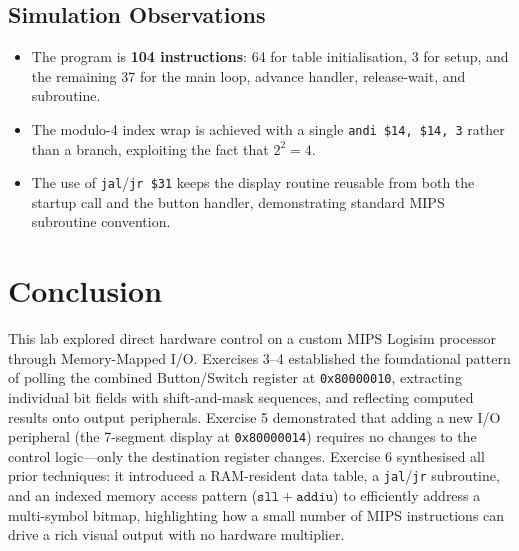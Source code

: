\documentclass[12pt,a4paper]{article}
\begin{document}
\subsection{Simulation Observations}
\begin{itemize}
    \item The program is \textbf{104 instructions}: 64 for table initialisation, 3 for setup, and the remaining 37 for the main loop, advance handler, release-wait, and subroutine.
    \item The modulo-4 index wrap is achieved with a single \texttt{andi \$14, \$14, 3} rather than a branch, exploiting the fact that $2^2 = 4$.
    \item The use of \texttt{jal}/\texttt{jr \$31} keeps the display routine reusable from both the startup call and the button handler, demonstrating standard MIPS subroutine convention.
\end{itemize}

\section{Conclusion}

This lab explored direct hardware control on a custom MIPS Logisim processor through Memory-Mapped I/O. Exercises 3--4 established the foundational pattern of polling the combined Button/Switch register at \texttt{0x80000010}, extracting individual bit fields with shift-and-mask sequences, and reflecting computed results onto output peripherals. Exercise 5 demonstrated that adding a new I/O peripheral (the 7-segment display at \texttt{0x80000014}) requires no changes to the control logic—only the destination register changes. Exercise 6 synthesised all prior techniques: it introduced a RAM-resident data table, a \texttt{jal}/\texttt{jr} subroutine, and an indexed memory access pattern ($\mathtt{sll} + \mathtt{addiu}$) to efficiently address a multi-symbol bitmap, highlighting how a small number of MIPS instructions can drive a rich visual output with no hardware multiplier.
\end{document}
